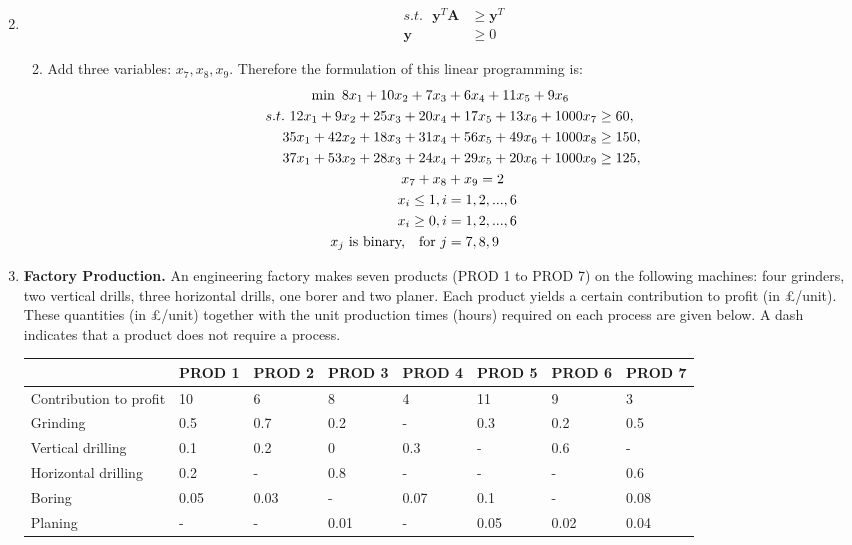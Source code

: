 \documentclass[12pt,a4paper]{article}
\makeatletter
\newtheorem*{solution}{Solution}
\theoremstyle{definition}
\renewenvironment{solution}[1][Solution] {\par\pushQED{\qed}\normalfont\topsep6\p@\@plus6\p@\relax\trivlist\item[\hskip\labelsep\bfseries#1\@addpunct{.}]\ignorespaces}{\popQED\endtrivlist\@endpefalse} \makeatother
\makeatother
\begin{document}
\begin{enumerate}
\begin{solution}
\begin{enumerate}
\begin{align*}
    			s.t.\text{  }\mathbf{y}^{T}\mathbf{A}&\ge \mathbf{y}^{T}\\
    			\mathbf{y}&\ge 0
    		\end{align*}
    		\item Add three variables: $ x_7,x_8,x_9 $. Therefore the formulation of this linear programming is:
    		\begin{align*}
    		\min \text{  }8x_1+10x_2+7x_3&+6x_4+11x_5+9x_6\\
    		s.t.\text{  }12x_1+9x_2+25x_3+20x_4&+17x_5+13x_6 + 1000x_7\ge 60,\\
    		35x_1+42x_2+18x_3+31x_4&+56x_5+49x_6 + 1000x_8\ge 150,\\
    		37x_1+53x_2+28x_3+24x_4&+29x_5+20x_6+ 1000x_9\ge 125,\\
    		x_7 + x_8 &+ x_9 = 2\\
    		x_i \le 1, i &= 1,2,...,6\\
    		x_i \ge 0, i &= 1,2,...,6\\
    		x_j \text{ is binary,\quad for }j &= 7,8,9
    		\end{align*}
    	\end{enumerate}
    \end{solution}
    
    
	\item 
	\textbf{Factory Production. }An engineering factory makes seven products (PROD 1 to PROD 7) on the following machines: four grinders, two vertical drills, three horizontal drills, one borer and two planer. Each product yields a certain contribution to profit (in \pounds/unit). These quantities (in \pounds/unit) together with the unit production times (hours) required on each process are given below. A dash indicates that a product does not require a process.
	
	\begin{table}[htbp]
		\scriptsize
		\centering
		\renewcommand\arraystretch{1.1}
		\begin{tabular}{m{} m{}<{\centering} m{}<{\centering} m{}<{\centering} m{}<{\centering} m{}<{\centering} m{}<{\centering} m{}<{\centering}}
			\hline
			& \textbf{PROD 1} & \textbf{PROD 2} & \textbf{PROD 3} & \textbf{PROD 4} & \textbf{PROD 5} & \textbf{PROD 6} &  \textbf{PROD 7} \\\hline
			Contribution to profit & 10 & 6 & 8 & 4 & 11 & 9 & 3 \\
			Grinding & 0.5 & 0.7 & 0.2 & - & 0.3 & 0.2 & 0.5 \\
			Vertical drilling & 0.1 & 0.2 & 0 & 0.3 & - & 0.6 & - \\
			Horizontal drilling & 0.2 & - & 0.8 & - & - & - & 0.6 \\
			Boring & 0.05 & 0.03 & - & 0.07 & 0.1 & - & 0.08 \\
			Planing & - & - & 0.01 & - & 0.05 & 0.02 & 0.04 \\
			\hline
		\end{tabular}
	\end{table}
	

\end{enumerate}
\end{document}
